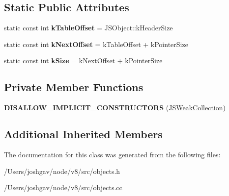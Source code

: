 \subsection*{Static Public Attributes}
\begin{DoxyCompactItemize}
\item 
static const int {\bfseries k\+Table\+Offset} = J\+S\+Object\+::k\+Header\+Size\hypertarget{classv8_1_1internal_1_1_j_s_weak_collection_aec7728f81b75ffdf112c4371af4e3e61}{}\label{classv8_1_1internal_1_1_j_s_weak_collection_aec7728f81b75ffdf112c4371af4e3e61}

\item 
static const int {\bfseries k\+Next\+Offset} = k\+Table\+Offset + k\+Pointer\+Size\hypertarget{classv8_1_1internal_1_1_j_s_weak_collection_a733260c7b194b11f4ba80fe0ff3c835c}{}\label{classv8_1_1internal_1_1_j_s_weak_collection_a733260c7b194b11f4ba80fe0ff3c835c}

\item 
static const int {\bfseries k\+Size} = k\+Next\+Offset + k\+Pointer\+Size\hypertarget{classv8_1_1internal_1_1_j_s_weak_collection_a9589d84cb7af40ee80511bdd2788d955}{}\label{classv8_1_1internal_1_1_j_s_weak_collection_a9589d84cb7af40ee80511bdd2788d955}

\end{DoxyCompactItemize}
\subsection*{Private Member Functions}
\begin{DoxyCompactItemize}
\item 
{\bfseries D\+I\+S\+A\+L\+L\+O\+W\+\_\+\+I\+M\+P\+L\+I\+C\+I\+T\+\_\+\+C\+O\+N\+S\+T\+R\+U\+C\+T\+O\+RS} (\hyperlink{classv8_1_1internal_1_1_j_s_weak_collection}{J\+S\+Weak\+Collection})\hypertarget{classv8_1_1internal_1_1_j_s_weak_collection_a4efbb46e56cacd878d4bb270402cd96e}{}\label{classv8_1_1internal_1_1_j_s_weak_collection_a4efbb46e56cacd878d4bb270402cd96e}

\end{DoxyCompactItemize}
\subsection*{Additional Inherited Members}


The documentation for this class was generated from the following files\+:\begin{DoxyCompactItemize}
\item 
/\+Users/joshgav/node/v8/src/objects.\+h\item 
/\+Users/joshgav/node/v8/src/objects.\+cc\end{DoxyCompactItemize}
